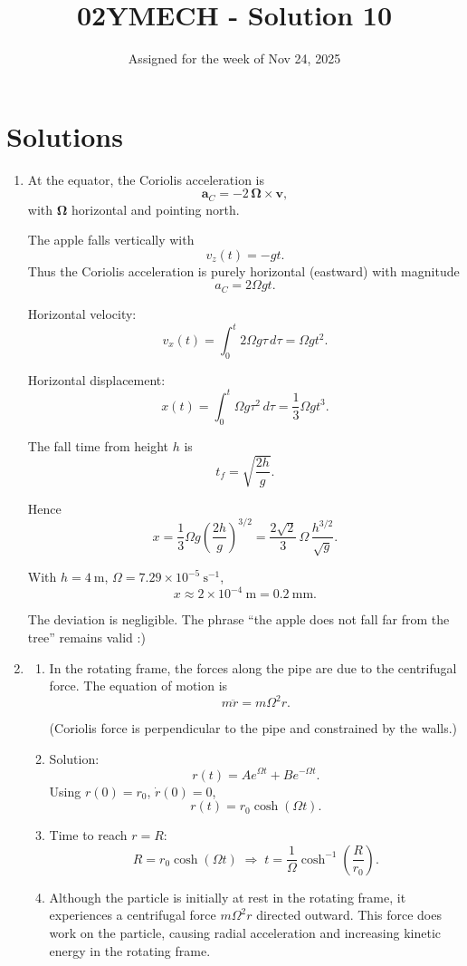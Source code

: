 \documentclass[12pt]{article}
\title{02YMECH - Solution 10}
\date{Assigned for the week of Nov 24, 2025}
\author{}
\begin{document}
\maketitle

\section*{Solutions}

\begin{enumerate}

\item At the equator, the Coriolis acceleration is
\[
\mathbf a_C = -2\,\boldsymbol{\Omega}\times\mathbf v,
\]
with \(\boldsymbol{\Omega}\) horizontal and pointing north.

The apple falls vertically with
\[
v_z(t)=-gt.
\]
Thus the Coriolis acceleration is purely horizontal (eastward) with magnitude
\[
a_C = 2\Omega g t.
\]

Horizontal velocity:
\[
v_x(t)=\int_0^t 2\Omega g \tau\,d\tau=\Omega g t^2.
\]

Horizontal displacement:
\[
x(t)=\int_0^t \Omega g \tau^2\,d\tau=\frac{1}{3}\Omega g t^3.
\]

The fall time from height \(h\) is
\[
t_f=\sqrt{\frac{2h}{g}}.
\]

Hence
\[
x=\frac{1}{3}\Omega g\left(\frac{2h}{g}\right)^{3/2}
=\frac{2\sqrt{2}}{3}\,\Omega\,\frac{h^{3/2}}{\sqrt{g}}.
\]

With \(h=4~\mathrm{m}\), \(\Omega=7.29\times10^{-5}~\mathrm{s^{-1}}\),
\[
x \approx 2\times10^{-4}\ \mathrm{m} = 0.2\ \mathrm{mm}.
\]

The deviation is negligible.  
The phrase “the apple does not fall far from the tree” remains valid :)

\newpage

\item 
\begin{enumerate}
\item[(a)] In the rotating frame, the forces along the pipe are due to the centrifugal force.
The equation of motion is
\[
m\ddot r = m\Omega^2 r.
\]

(Coriolis force is perpendicular to the pipe and constrained by the walls.)

\item[(b)] Solution:
\[
r(t)=A e^{\Omega t}+B e^{-\Omega t}.
\]
Using \(r(0)=r_0\), \(\dot r(0)=0\),
\[
r(t)=r_0\cosh(\Omega t).
\]

\item[(c)] Time to reach \(r=R\):
\[
R=r_0\cosh(\Omega t)
\;\Rightarrow\;
t=\frac{1}{\Omega}\cosh^{-1}\!\left(\frac{R}{r_0}\right).
\]

\item[(d)] Although the particle is initially at rest in the rotating frame, it experiences a centrifugal force \(m\Omega^2 r\) directed outward. This force does work on the particle, causing radial acceleration and increasing kinetic energy in the rotating frame.
\end{enumerate}

\end{enumerate}
\end{document}

